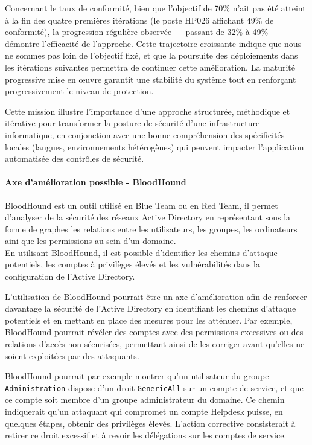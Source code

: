 \documentclass[a4paper, 11pt]{article}
\begin{document}
Concernant le taux de conformité, bien que l'objectif de 70\% n'ait pas été atteint à la fin des quatre premières itérations (le poste HP026 affichant 49\% de 
conformité), la progression régulière observée --- passant de 32\% à 49\% --- démontre l'efficacité de l'approche. Cette trajectoire croissante indique que nous 
ne sommes pas loin de l'objectif fixé, et que la poursuite des déploiements dans les itérations suivantes permettra de continuer cette amélioration. La maturité
 progressive mise en œuvre garantit une stabilité du système tout en renforçant progressivement le niveau de protection.
\par\bigskip

Cette mission illustre l'importance d'une approche structurée, méthodique et itérative pour transformer la posture de sécurité d'une infrastructure informatique,
 en conjonction avec une bonne compréhension des spécificités locales (langues, environnements hétérogènes) qui peuvent impacter l'application automatisée des contrôles
  de sécurité.


\paragraph{Axe d'amélioration possible - BloodHound}

\href{https://specterops.io/bloodhound-enterprise/}{BloodHound} est un outil utilisé en Blue Team ou en Red Team, il permet d'analyser de la sécurité
 des réseaux Active Directory en représentant sous la forme de graphes les relations entre les utilisateurs,
  les groupes, les ordinateurs aini que les permissions au sein d'un domaine.\\
 En utilisant BloodHound, il est possible d'identifier les chemins d'attaque potentiels,
  les comptes à privilèges élevés et les vulnérabilités dans la configuration de l'Active Directory.
  \par\bigskip

  L'utilisation de BloodHound pourrait être un axe d'amélioration afin de renforcer davantage la sécurité de l'Active Directory
   en identifiant les chemins d'attaque potentiels et en mettant en place des mesures pour les atténuer.
    Par exemple, BloodHound pourrait révéler des comptes avec des permissions excessives ou des relations d'accès non sécurisées,
     permettant ainsi de les corriger avant qu'elles ne soient exploitées par des attaquants.

  BloodHound pourrait par exemple montrer qu'un utilisateur du groupe \texttt{Administration} dispose d'un droit \texttt{GenericAll}
  sur un compte de service, et que ce compte soit membre d'un groupe administrateur du domaine.
  Ce chemin indiquerait qu'un attaquant qui compromet un compte Helpdesk puisse, en quelques étapes,
  obtenir des privilèges élevés. L'action corrective consisterait à retirer ce droit excessif et à revoir
  les délégations sur les comptes de service.
\end{document}
